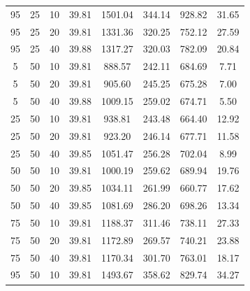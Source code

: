\begin{table}[H]
\begin{tabular}{ccc|c|c|c|c|c}
95 & 25 & 10 & \cellcolor{gray!80}39.81 & \cellcolor{gray!1}1501.04 & \cellcolor{gray!1}344.14 & \cellcolor{gray!1}928.82 & 31.65\\
95 & 25 & 20 & \cellcolor{gray!80}39.81 & \cellcolor{gray!1}1331.36 & \cellcolor{gray!1}320.25 & \cellcolor{gray!52}752.12 & 27.59\\
95 & 25 & 40 & \cellcolor{gray!80}39.88 & \cellcolor{gray!1}1317.27 & \cellcolor{gray!1}320.03 & \cellcolor{gray!43}782.09 & 20.84\\
5 & 50 & 10 & \cellcolor{gray!80}39.81 & \cellcolor{gray!53}888.57 & \cellcolor{gray!19}242.11 & \cellcolor{gray!73}684.69 & 7.71\\
5 & 50 & 20 & \cellcolor{gray!80}39.81 & \cellcolor{gray!51}905.60 & \cellcolor{gray!16}245.25 & \cellcolor{gray!76}675.28 & 7.00\\
5 & 50 & 40 & \cellcolor{gray!80}39.88 & \cellcolor{gray!33}1009.15 & \cellcolor{gray!4}259.02 & \cellcolor{gray!76}674.71 & 5.50\\
25 & 50 & 10 & \cellcolor{gray!80}39.81 & \cellcolor{gray!45}938.81 & \cellcolor{gray!18}243.48 & \cellcolor{gray!79}664.40 & 12.92\\
25 & 50 & 20 & \cellcolor{gray!80}39.81 & \cellcolor{gray!48}923.20 & \cellcolor{gray!16}246.14 & \cellcolor{gray!75}677.71 & 11.58\\
25 & 50 & 40 & \cellcolor{gray!80}39.85 & \cellcolor{gray!26}1051.47 & \cellcolor{gray!6}256.28 & \cellcolor{gray!68}702.04 & 8.99\\
50 & 50 & 10 & \cellcolor{gray!80}39.81 & \cellcolor{gray!35}1000.19 & \cellcolor{gray!3}259.62 & \cellcolor{gray!71}689.94 & 19.76\\
50 & 50 & 20 & \cellcolor{gray!80}39.85 & \cellcolor{gray!29}1034.11 & \cellcolor{gray!1}261.99 & \cellcolor{gray!80}660.77 & 17.62\\
50 & 50 & 40 & \cellcolor{gray!80}39.85 & \cellcolor{gray!21}1081.69 & \cellcolor{gray!1}286.20 & \cellcolor{gray!69}698.26 & 13.34\\
75 & 50 & 10 & \cellcolor{gray!80}39.81 & \cellcolor{gray!3}1188.37 & \cellcolor{gray!1}311.46 & \cellcolor{gray!56}738.11 & 27.33\\
75 & 50 & 20 & \cellcolor{gray!80}39.81 & \cellcolor{gray!6}1172.89 & \cellcolor{gray!1}269.57 & \cellcolor{gray!56}740.21 & 23.88\\
75 & 50 & 40 & \cellcolor{gray!80}39.81 & \cellcolor{gray!6}1170.34 & \cellcolor{gray!1}301.70 & \cellcolor{gray!49}763.01 & 18.17\\
95 & 50 & 10 & \cellcolor{gray!80}39.81 & \cellcolor{gray!1}1493.67 & \cellcolor{gray!1}358.62 & \cellcolor{gray!28}829.74 & 34.27\\

\end{tabular}
\end{table}
